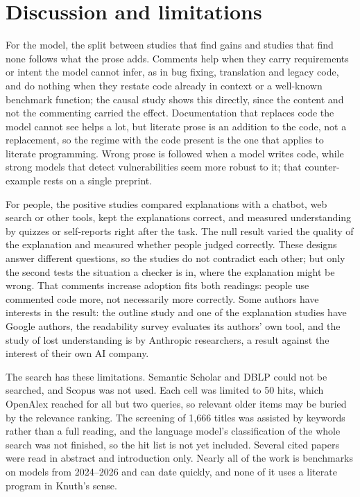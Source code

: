 \section{Discussion and limitations}
\label{sec:ai-rq23-discussion}

For the model, the split between studies that find gains and studies that find
none follows what the prose adds.
Comments help when they carry requirements or intent the model cannot infer, as
in bug fixing, translation and legacy code, and do nothing when they restate
code already in context or a well-known benchmark function; the causal study
shows this directly, since the content and not the commenting carried the
effect\autocite{pan2026talking}.
Documentation that replaces code the model cannot see helps a
lot\autocite{eghbali2026equivalence,arman2026compact}, but literate prose is an
addition to the code, not a replacement, so the regime with the code present is
the one that applies to literate programming.
Wrong prose is followed when a model writes code, while strong models that
detect vulnerabilities seem more robust to it; that counter-example rests on a
single preprint.

For people, the positive studies compared explanations with a chatbot, web
search or other tools, kept the explanations correct, and measured
understanding by quizzes or self-reports right after the task.
The null result varied the quality of the explanation and measured whether
people judged correctly.
These designs answer different questions, so the studies do not contradict each
other; but only the second tests the situation a checker is in, where the
explanation might be wrong.
That comments increase adoption fits both readings: people use commented code
more, not necessarily more correctly.
Some authors have interests in the result: the outline study and one of the
explanation studies have Google authors, the readability survey evaluates its
authors' own tool, and the study of lost understanding is by Anthropic
researchers, a result against the interest of their own AI company.

The search has these limitations.
Semantic Scholar and DBLP could not be searched, and Scopus was not used.
Each cell was limited to 50 hits, which OpenAlex reached for all but two
queries, so relevant older items may be buried by the relevance ranking.
The screening of 1,666 titles was assisted by keywords rather than a full
reading, and the language model's classification of the whole search was not
finished, so the hit list is not yet included.
Several cited papers were read in abstract and introduction only.
Nearly all of the work is benchmarks on models from 2024--2026 and can date
quickly, and none of it uses a literate program in Knuth's sense.

